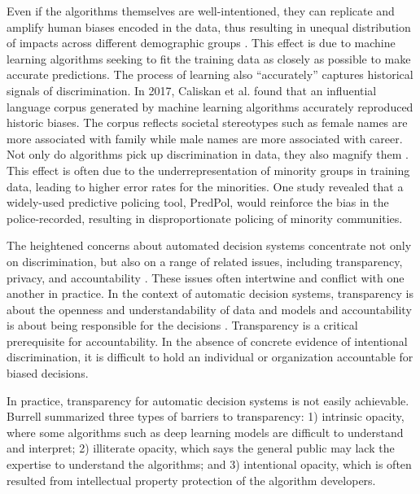 \documentclass[11pt]{article}
\begin{document}
Even if the algorithms themselves are well-intentioned, they can replicate and amplify human biases encoded in the data, thus resulting in unequal distribution of impacts across different demographic groups \cite{zliobaite2015survey, lepri2017tyranny, barocas2016big}. This effect is due to machine learning algorithms seeking to fit the training data as closely as possible to make accurate predictions. The process of learning also “accurately” captures historical signals of discrimination. In 2017, Caliskan et al. \cite{caliskan2017semantics} found that an influential language corpus \cite{pennington2014glove} generated by machine learning algorithms accurately reproduced historic biases. The corpus reflects societal stereotypes such as female names are more associated with family while male names are more associated with career. Not only do algorithms pick up discrimination in data, they also magnify them \cite{chouldechova2018frontiers}. This effect is often due to the underrepresentation of minority groups in training data, leading to higher error rates for the minorities. One study \cite{lum2016predict} revealed that a widely-used predictive policing tool, PredPol, would reinforce the bias in the police-recorded, resulting in disproportionate policing of minority communities. 

The heightened concerns about automated decision systems concentrate not only on discrimination, but also on a range of related issues, including transparency, privacy, and accountability \cite{young2019beyond}. These issues often intertwine and conflict with one another in practice. In the context of automatic decision systems, transparency is about the openness and understandability of data and models and accountability is about being responsible for the decisions \cite{lepri2018fair}. Transparency is a critical prerequisite for accountability. In the absence of concrete evidence of intentional discrimination, it is difficult to hold an individual or organization accountable for biased decisions. 

In practice, transparency for automatic decision systems is not easily achievable. Burrell \cite{burrell2016machine} summarized three types of barriers to transparency: 1) intrinsic opacity, where some algorithms such as deep learning models are difficult to understand and interpret; 2) illiterate opacity, which says the general public may lack the expertise to understand the algorithms; and 3) intentional opacity, which is often resulted from intellectual property protection of the algorithm developers. 
\end{document}

